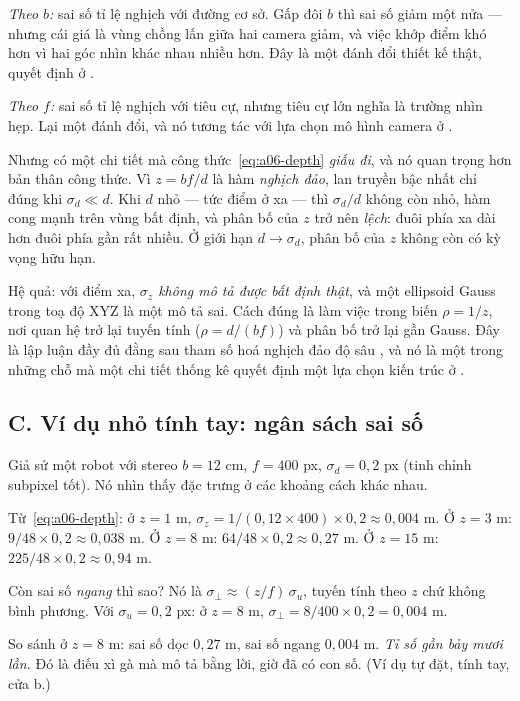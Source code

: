 \documentclass[../../vslam.tex]{subfiles}
\begin{document}
\emph{Theo \(b\):} sai số tỉ lệ nghịch với đường cơ sở. Gấp đôi \(b\) thì sai số giảm một nửa --- nhưng cái giá là vùng chồng lấn giữa hai camera giảm, và việc khớp điểm khó hơn vì hai góc nhìn khác nhau nhiều hơn. Đây là một đánh đổi thiết kế thật, quyết định ở .

\emph{Theo \(f\):} sai số tỉ lệ nghịch với tiêu cự, nhưng tiêu cự lớn nghĩa là trường nhìn hẹp. Lại một đánh đổi, và nó tương tác với lựa chọn mô hình camera ở .

Nhưng có một chi tiết mà công thức~\eqref{eq:a06-depth} \emph{giấu đi}, và nó quan trọng hơn bản thân công thức. Vì \(z = bf/d\) là hàm \emph{nghịch đảo}, lan truyền bậc nhất chỉ đúng khi \(\sigma_d \ll d\). Khi \(d\) nhỏ --- tức điểm ở xa --- thì \(\sigma_d/d\) không còn nhỏ, hàm cong mạnh trên vùng bất định, và phân bố của \(z\) trở nên \emph{lệch}: đuôi phía xa dài hơn đuôi phía gần rất nhiều. Ở giới hạn \(d \to \sigma_d\), phân bố của \(z\) không còn có kỳ vọng hữu hạn.

Hệ quả: với điểm xa, \emph{\(\sigma_z\) không mô tả được bất định thật}, và một ellipsoid Gauss trong toạ độ XYZ là một mô tả sai. Cách đúng là làm việc trong biến \(\rho = 1/z\), nơi quan hệ trở lại tuyến tính (\(\rho = d/(bf)\)) và phân bố trở lại gần Gauss. Đây là lập luận đầy đủ đằng sau tham số hoá nghịch đảo độ sâu \cite{civera2008inversedepth}, và nó là một trong những chỗ mà một chi tiết thống kê quyết định một lựa chọn kiến trúc ở .

\subsection{C. Ví dụ nhỏ tính tay: ngân sách sai số}

Giả sử một robot với stereo \(b = 12\) cm, \(f = 400\) px, \(\sigma_d = 0{,}2\) px (tinh chỉnh subpixel tốt). Nó nhìn thấy đặc trưng ở các khoảng cách khác nhau.

Từ~\eqref{eq:a06-depth}: ở \(z = 1\) m, \(\sigma_z = 1/(0{,}12\times400)\times 0{,}2 \approx 0{,}004\) m. Ở \(z=3\) m: \(9/48\times0{,}2 \approx 0{,}038\) m. Ở \(z = 8\) m: \(64/48\times0{,}2 \approx 0{,}27\) m. Ở \(z=15\) m: \(225/48\times0{,}2 \approx 0{,}94\) m.

Còn sai số \emph{ngang} thì sao? Nó là \(\sigma_\perp \approx (z/f)\,\sigma_u\), tuyến tính theo \(z\) chứ không bình phương. Với \(\sigma_u = 0{,}2\) px: ở \(z = 8\) m, \(\sigma_\perp = 8/400\times0{,}2 = 0{,}004\) m.

So sánh ở \(z = 8\) m: sai số dọc \(0{,}27\) m, sai số ngang \(0{,}004\) m. \emph{Tỉ số gần bảy mươi lần.} Đó là điếu xì gà mà  mô tả bằng lời, giờ đã có con số. (Ví dụ tự đặt, tính tay, cửa b.)
\end{document}

